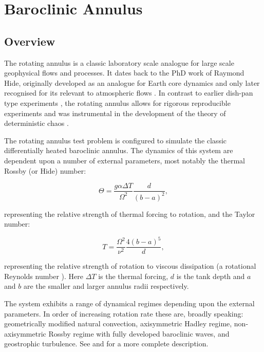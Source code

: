 
\section{Baroclinic Annulus}
\label{sect:annulus}

\subsection{Overview}

The rotating annulus is a classic laboratory scale analogue for large scale
geophysical flows and processes. It dates back to the PhD work of Raymond Hide,
originally developed as an analogue for Earth core dynamics \citep{hide1952} and only
later recognised for its relevant to atmospheric flows \citep{hide1953, hide2006}.
In contrast to earlier dish-pan type experiments \citep{fultz1951}, the rotating
annulus allows for rigorous reproducible experiments and was instrumental in the
development of the theory of deterministic chaos \citep{lorenz1963}.

The rotating annulus test problem is configured to simulate the classic
differentially heated baroclinic annulus. The dynamics
of this system are dependent upon a number of external parameters, most notably
the thermal Rossby (or Hide) number:

\begin{equation}\label{eqn:hide_number}
  \Theta = \frac{g \alpha \Delta T}{\Omega^2} \frac{d}{(b - a)^2},
\end{equation}

representing the relative strength of thermal forcing to rotation, and the Taylor number:

\begin{equation}\label{eqn:taylor_number}
  T = \frac{\Omega^2}{\nu^2} \frac{4(b - a)^5}{d},
\end{equation}

representing the relative strength of rotation to viscous dissipation (a rotational
Reynolds number \citep{lorenz1967}). Here $\Delta T$ is the thermal forcing, $d$ is the tank depth and $a$ and $b$
are the smaller and larger annulus radii respectively.

The system exhibits a range of dynamical regimes depending upon the external parameters.
In order of increasing rotation
rate these are, broadly speaking: geometrically modified natural convection,
axisymmetric Hadley regime, non-axisymmetric Rossby regime with fully developed
baroclinic waves, and geostrophic turbulence. See \citet{hide1975} and \citet{frueh1997}
for a more complete description.

